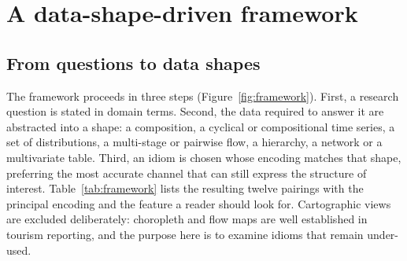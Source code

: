 \documentclass[11pt,a4paper]{article}
\begin{document}
\section{A data-shape-driven framework}\label{sec:framework}

\subsection{From questions to data shapes}
The framework proceeds in three steps (Figure~\ref{fig:framework}). First, a research question is stated in
domain terms. Second, the data required to answer it are abstracted into a shape: a composition, a cyclical
or compositional time series, a set of distributions, a multi-stage or pairwise flow, a hierarchy, a network
or a multivariate table. Third, an idiom is chosen whose encoding matches that shape, preferring the most
accurate channel that can still express the structure of interest. Table~\ref{tab:framework} lists the
resulting twelve pairings with the principal encoding and the feature a reader should look for. Cartographic
views are excluded deliberately: choropleth and flow maps are well established in tourism reporting, and the
purpose here is to examine idioms that remain under-used.
\end{document}
